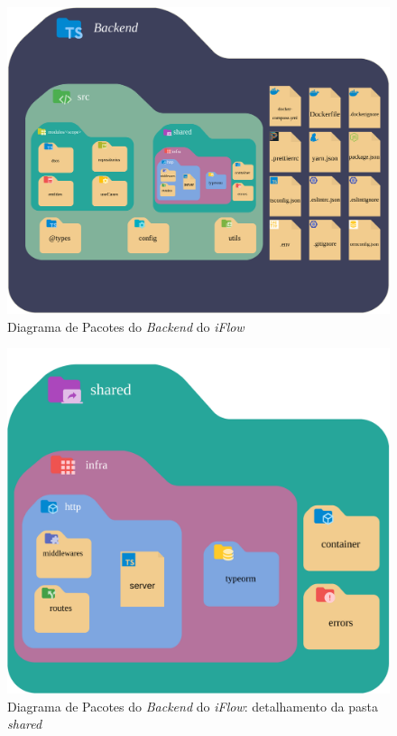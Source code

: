 \begin{figure}[]
    \begin{center}
        \caption{{Diagrama de Pacotes do \textit{Backend} do \textit{iFlow}}}
        \label{fig:pacotes_backend}
        \includegraphics[scale=0.9]{figuras/Proposta/Diagrama_de_Pacotes-Backend.png}
    \end{center}
\end{figure}

\begin{figure}[]
    \begin{center}
        \caption{{Diagrama de Pacotes do \textit{Backend} do \textit{iFlow}: detalhamento da pasta \textit{shared}}}
        \label{fig:pacotes_backend_shared}
        \includegraphics[scale=0.9]{figuras/Proposta/Diagrama_de_Pacotes-Backend_shared.png}
    \end{center}
\end{figure}

